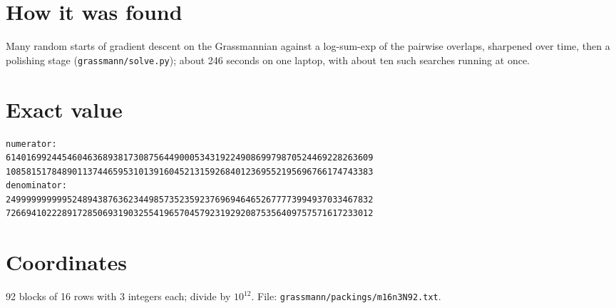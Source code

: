 \documentclass[11pt,a4paper]{article}
\begin{document}
\section{How it was found}
Many random starts of gradient descent on the Grassmannian against a log-sum-exp of the pairwise overlaps, sharpened over time, then a polishing stage (\texttt{grassmann/solve.py}); about 246 seconds on one laptop, with about ten such searches running at once.


\appendix
\section{Exact value}
{\small
\begin{verbatim}
numerator:
614016992445460463689381730875644900053431922490869979870524469228263609
108581517848901137446595310139160452131592684012369552195696766174743383
denominator:
249999999999524894387636234498573523592376969464652677773994937033467832
726694102228917285069319032554196570457923192920875356409757571617233012
\end{verbatim}}

\section{Coordinates}
92 blocks of 16 rows with 3 integers each; divide by $10^{12}$. File: \texttt{grassmann/packings/m16n3N92.txt}.
{\tiny
\begin{multicols}{3}
\end{multicols}}
\end{document}
